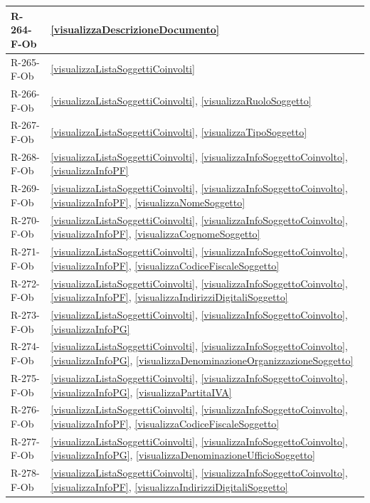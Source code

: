 \begin{longtable}{|p{4cm}|p{10cm}|}
R-264-F-Ob & \ref{visualizzaDescrizioneDocumento} \\
\hline
R-265-F-Ob & \ref{visualizzaListaSoggettiCoinvolti} \\
\hline
R-266-F-Ob & \ref{visualizzaListaSoggettiCoinvolti}, \ref{visualizzaRuoloSoggetto} \\
\hline
R-267-F-Ob & \ref{visualizzaListaSoggettiCoinvolti}, \ref{visualizzaTipoSoggetto} \\
\hline
R-268-F-Ob & \ref{visualizzaListaSoggettiCoinvolti}, \ref{visualizzaInfoSoggettoCoinvolto}, \ref{visualizzaInfoPF} \\
\hline
R-269-F-Ob & \ref{visualizzaListaSoggettiCoinvolti}, \ref{visualizzaInfoSoggettoCoinvolto}, \ref{visualizzaInfoPF}, \ref{visualizzaNomeSoggetto} \\
\hline
R-270-F-Ob & \ref{visualizzaListaSoggettiCoinvolti}, \ref{visualizzaInfoSoggettoCoinvolto}, \ref{visualizzaInfoPF}, \ref{visualizzaCognomeSoggetto} \\
\hline
R-271-F-Ob & \ref{visualizzaListaSoggettiCoinvolti}, \ref{visualizzaInfoSoggettoCoinvolto}, \ref{visualizzaInfoPF}, \ref{visualizzaCodiceFiscaleSoggetto} \\
\hline
R-272-F-Ob & \ref{visualizzaListaSoggettiCoinvolti}, \ref{visualizzaInfoSoggettoCoinvolto}, \ref{visualizzaInfoPF}, \ref{visualizzaIndirizziDigitaliSoggetto} \\
\hline
R-273-F-Ob & \ref{visualizzaListaSoggettiCoinvolti}, \ref{visualizzaInfoSoggettoCoinvolto}, \ref{visualizzaInfoPG} \\
\hline
R-274-F-Ob & \ref{visualizzaListaSoggettiCoinvolti}, \ref{visualizzaInfoSoggettoCoinvolto}, \ref{visualizzaInfoPG}, \ref{visualizzaDenominazioneOrganizzazioneSoggetto} \\
\hline
R-275-F-Ob & \ref{visualizzaListaSoggettiCoinvolti}, \ref{visualizzaInfoSoggettoCoinvolto}, \ref{visualizzaInfoPG}, \ref{visualizzaPartitaIVA} \\
\hline
R-276-F-Ob & \ref{visualizzaListaSoggettiCoinvolti}, \ref{visualizzaInfoSoggettoCoinvolto}, \ref{visualizzaInfoPF}, \ref{visualizzaCodiceFiscaleSoggetto} \\
\hline
R-277-F-Ob & \ref{visualizzaListaSoggettiCoinvolti}, \ref{visualizzaInfoSoggettoCoinvolto}, \ref{visualizzaInfoPG}, \ref{visualizzaDenominazioneUfficioSoggetto} \\
\hline
R-278-F-Ob & \ref{visualizzaListaSoggettiCoinvolti}, \ref{visualizzaInfoSoggettoCoinvolto}, \ref{visualizzaInfoPF}, \ref{visualizzaIndirizziDigitaliSoggetto} \\

\end{longtable}
